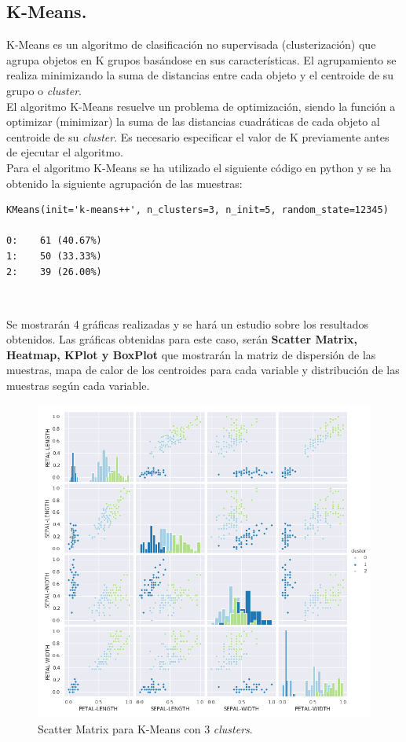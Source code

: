 \documentclass[a4paper, 20pt]{article}
\begin{document}
{\subsection{K-Means.}

K-Means es un algoritmo de clasificación no supervisada (clusterización) que agrupa objetos en K grupos basándose en sus características. El agrupamiento se realiza minimizando la suma de distancias entre cada objeto y el centroide de su grupo o \textit{cluster}.\\ 

El algoritmo K-Means resuelve un problema de optimización, siendo la función a optimizar (minimizar) la suma de las distancias cuadráticas de cada objeto al centroide de su \textit{cluster}. Es necesario especificar el valor de K previamente antes de ejecutar el algoritmo.\\

Para el algoritmo K-Means se ha utilizado el siguiente código en python y se ha obtenido la siguiente agrupación de las muestras:\\

\begin{lstlisting}
KMeans(init='k-means++', n_clusters=3, n_init=5, random_state=12345)

0:    61 (40.67%)
1:    50 (33.33%)
2:    39 (26.00%)
\end{lstlisting}\

Se mostrarán 4 gráficas realizadas y se hará un estudio sobre los resultados obtenidos. Las gráficas obtenidas para este caso, serán \textbf{Scatter Matrix, Heatmap, KPlot y BoxPlot} que mostrarán la matriz de dispersión de las muestras, mapa de calor de los centroides para cada variable y distribución de las muestras según cada variable.

\clearpage

\begin{figure}[h]
\centering
\includegraphics[scale=0.62]{dani/scatmatrixK-MeansIRIS.png}
\caption{Scatter Matrix para K-Means con 3 \textit{clusters}.}
\label{smkm}
\end{figure}\

}
\end{document}

